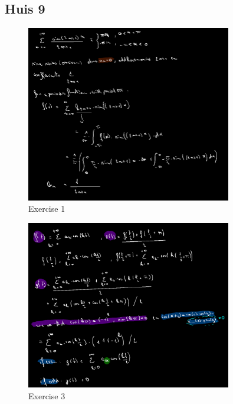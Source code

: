 \documentclass[a4paper]{report}
\begin{document}







\subsection*{Huis 9}

\begin{figure}[H]
	\centering
	\includegraphics[width=0.8\textwidth]{assets/huis_9_ex_1.png}
	\caption{Exercise 1}
	\label{fig:huis_9_ex_1}
\end{figure}





\begin{figure}[H]
	\centering
	\includegraphics[width=0.8\textwidth]{assets/huis_9_ex_3.png}
	\caption{Exercise 3}
	\label{fig:huis_9_ex_3}
\end{figure}
\end{document}
